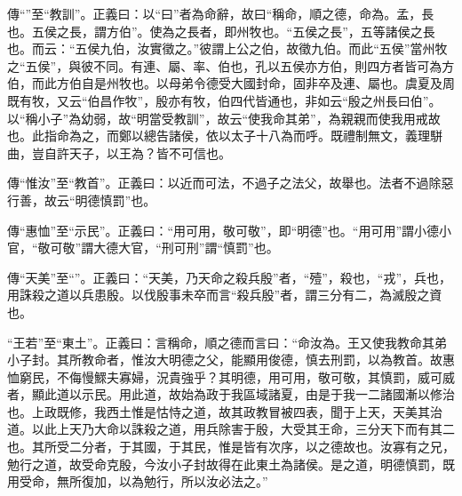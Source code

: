 {\noindent\zhuan{}\fzbyks 傳“”至“教訓”。正義曰：以“曰”者為命辭，故曰“稱命，順之德，命為。孟，長也。五侯之長，謂方伯”。使為之長者，即州牧也。“五侯之長”，五等諸侯之長也。而云：“五侯九伯，汝實徵之。”彼謂上公之伯，故徵九伯。而此“五侯”當州牧之“五侯”，與彼不同。有連、屬、率、伯也，孔以五侯亦方伯，則四方者皆可為方伯，而此方伯自是州牧也。以母弟令德受大國封命，固非卒及連、屬也。虞夏及周既有牧，又云“伯昌作牧”，殷亦有牧，伯四代皆通也，非如云“殷之州長曰伯”。以“稱小子”為幼弱，故“明當受教訓”，故云“使我命其弟”，為親親而使我用戒故也。此指命為之，而鄭以總告諸侯，依以太子十八為而呼。既禮制無文，義理駢曲，豈自許天子，以王為？皆不可信也。 \par}

{\noindent\zhuan{}\fzbyks 傳“惟汝”至“教首”。正義曰：以近而可法，不過子之法父，故舉也。法者不過除惡行善，故云“明德慎罰”也。 \par}

{\noindent\zhuan{}\fzbyks 傳“惠恤”至“示民”。正義曰：“用可用，敬可敬”，即“明德”也。“用可用”謂小德小官，“敬可敬”謂大德大官，“刑可刑”謂“慎罰”也。 \par}

{\noindent\zhuan{}\fzbyks 傳“天美”至“”。正義曰：“天美，乃天命之殺兵殷”者，“殪”，殺也，“戎”，兵也，用誅殺之道以兵患殷。以伐殷事未卒而言“殺兵殷”者，謂三分有二，為滅殷之資也。 \par}

{\noindent\shu{}\fzkt “王若”至“東土”。正義曰：言稱命，順之德而言曰：“命汝為。王又使我教命其弟小子封。其所教命者，惟汝大明德之父，能顯用俊德，慎去刑罰，以為教首。故惠恤窮民，不侮慢鰥夫寡婦，況貴強乎？其明德，用可用，敬可敬，其慎罰，威可威者，顯此道以示民。用此道，故始為政于我區域諸夏，由是于我一二諸國漸以修治也。上政既修，我西土惟是怙恃之道，故其政教冒被四表，聞于上天，天美其治道。以此上天乃大命以誅殺之道，用兵除害于殷，大受其王命，三分天下而有其二也。其所受二分者，于其國，于其民，惟是皆有次序，以之德故也。汝寡有之兄，勉行之道，故受命克殷，今汝小子封故得在此東土為諸侯。是之道，明德慎罰，既用受命，無所復加，以為勉行，所以汝必法之。” \par}

